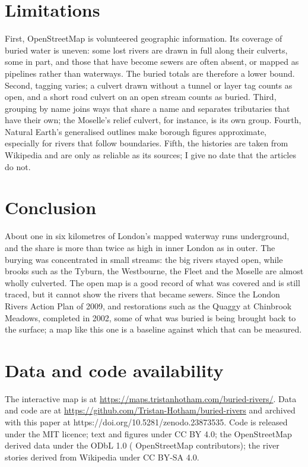 \documentclass[11pt,a4paper]{article}
\begin{document}
\section{Limitations}
First, OpenStreetMap is volunteered geographic information. Its coverage of buried water is uneven: some lost rivers are drawn in full along their culverts, some in part, and those that have become sewers are often absent, or mapped as pipelines rather than waterways. The buried totals are therefore a lower bound. Second, tagging varies; a culvert drawn without a tunnel or layer tag counts as open, and a short road culvert on an open stream counts as buried. Third, grouping by name joins ways that share a name and separates tributaries that have their own; the Moselle's relief culvert, for instance, is its own group. Fourth, Natural Earth's generalised outlines make borough figures approximate, especially for rivers that follow boundaries. Fifth, the histories are taken from Wikipedia and are only as reliable as its sources; I give no date that the articles do not.

\section{Conclusion}
About one in six kilometres of London's mapped waterway runs underground, and the share is more than twice as high in inner London as in outer. The burying was concentrated in small streams: the big rivers stayed open, while brooks such as the Tyburn, the Westbourne, the Fleet and the Moselle are almost wholly culverted. The open map is a good record of what was covered and is still traced, but it cannot show the rivers that became sewers. Since the London Rivers Action Plan of 2009, and restorations such as the Quaggy at Chinbrook Meadows, completed in 2002, some of what was buried is being brought back to the surface; a map like this one is a baseline against which that can be measured.

\section*{Data and code availability}
The interactive map is at \url{https://maps.tristanhotham.com/buried-rivers/}. Data and code are at \url{https://github.com/Tristan-Hotham/buried-rivers} and archived with this paper at https://doi.org/10.5281/zenodo.23873535. Code is released under the MIT licence; text and figures under CC BY 4.0; the OpenStreetMap derived data under the ODbL 1.0 (\textcopyright{} OpenStreetMap contributors); the river stories derived from Wikipedia under CC BY-SA 4.0.
\end{document}
